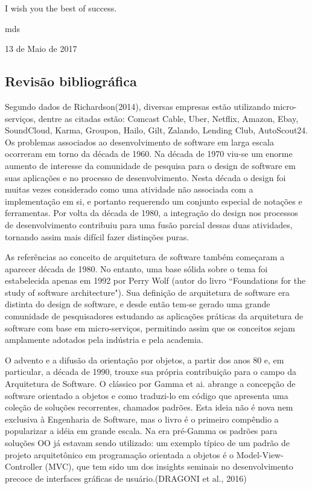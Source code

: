 \documentclass[journal]{IEEEtran}
\begin{document}
I wish you the best of success.

\hfill mds
 
\hfill 13 de Maio de 2017

\subsection{Revisão bibliográfica}

Segundo dados de Richardson(2014), diversas empresas estão utilizando micro-serviços, dentre as citadas estão: Comcast Cable, Uber, Netflix, Amazon, Ebay, SoundCloud, Karma, Groupon, Hailo, Gilt, Zalando, Lending Club, AutoScout24.
Os problemas associados ao desenvolvimento de software em larga escala ocorreram em torno da década de 1960. Na década de 1970 viu-se um enorme aumento de interesse da comunidade de pesquisa para o design de software em suas aplicações e  no processo de desenvolvimento. Nesta década o design foi muitas vezes considerado como uma atividade não associada com a implementação em si, e portanto requerendo um conjunto especial de notações e ferramentas. Por volta da década de 1980, a integração do design nos processos de desenvolvimento contribuiu para uma fusão parcial dessas duas atividades, tornando assim mais difícil fazer distinções puras.

As referências ao conceito de arquitetura de software também começaram a aparecer década de 1980. No entanto, uma base sólida sobre o tema foi estabelecida apenas em 1992 por Perry Wolf (autor do livro “Foundations for the study of software architecture"). Sua definição de arquitetura de software era distinta do design de software, e desde então tem-se gerado uma grande comunidade de pesquisadores estudando as aplicações práticas da arquitetura de software com base em micro-serviços, permitindo  assim que os conceitos sejam amplamente adotados pela indústria e pela academia.

O advento e a difusão da orientação por objetos, a partir dos anos 80 e, em particular, a década de 1990, trouxe sua própria contribuição para o campo da Arquitetura de Software. O clássico por Gamma et ai. abrange a concepção de software orientado a objetos e como traduzi-lo em código que apresenta uma coleção de soluções recorrentes, chamados padrões. Esta ideia não é nova nem exclusiva à Engenharia de Software, mas o livro é o primeiro compêndio a popularizar a idéia em grande escala. Na era pré-Gamma os padrões para soluções OO já estavam sendo utilizado: um exemplo típico de um padrão de projeto arquitetônico em programação orientada a objetos é o Model-View-Controller (MVC), que tem sido um dos insights seminais no desenvolvimento precoce de interfaces gráficas de usuário.(DRAGONI et al., 2016)
\end{document}
